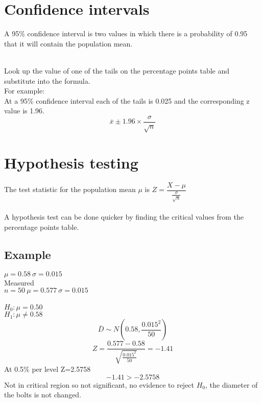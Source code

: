 \documentclass{article}[18pt]
\begin{document}
\section{Confidence intervals}
A 95\% confidence interval is two values in which there is a probability of 0.95 that it will contain the population mean.\\
\\
Look up the value of one of the tails on the percentage points table and substitute into the formula.\\
For example:\\
At a 95\% confidence interval each of the tails is 0.025 and the corresponding z value is 1.96.\\
$$\overline{x}\pm1.96\times\frac{\sigma}{\sqrt{n}}$$
\section{Hypothesis testing}
The test statistic for the population mean $\mu$ is $Z=\dfrac{X-\mu}{\frac{\sigma}{\sqrt{n}}}$\\
\\
A hypothesis test can be done quicker by finding the critical values from the percentage points table.
\subsection{Example}
$\mu=0.58 \ \sigma=0.015$\\
Measured\\
$n=50 \ \mu=0.577 \ \sigma=0.015$\\
\\
$H_0: \mu=0.50$\\
$H_1: \mu\neq0.58$\\
$$\overline{D}\sim N(0.58,\frac{0.015^2}{50})$$
$$Z=\frac{0.577-0.58}{\sqrt{\frac{0.015^2}{50}}}=-1.41$$
At 0.5\%  per level Z=2.5758
$$-1.41>-2.5758$$
Not in critical region so not significant, no evidence to reject $H_0$, the diameter of the bolts is not changed.
\newpage
\end{document}
